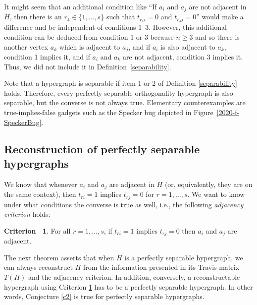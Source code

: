 \documentclass[%
12pt,
prereprint,
showpacs,
showkeys,
preprintnumbers,
amsmath,amssymb,
aps,
pra,
longbibliography,
notitlepage
]{revtex4-1}
\theoremstyle{definition}
\newtheorem{criterion}[theorem]{{\color{THM}Criterion\ }}
\begin{document}
	It might seem that an additional condition like
	``If $a_i$ and $a_j$ are not adjacent in $H$, then there is an $r_4 \in \{1,\ldots,s\}$ such that $t_{r_4 i}=0$ and $t_{r_4 j}=0$''
	would make a difference and be independent of conditions 1--3. However, this additional condition can be deduced from condition 1 or 3 because $n\geq 3$ and so there is another vertex $a_k$ which is adjacent to $a_j$, and if $a_i$ is also adjacent to $a_k$, condition 1 implies it, and if $a_i$ and $a_k$ are not adjacent, condition 3 implies it. Thus, we did not include it in Definition~\ref{separability}.
	
	Note that a hypergraph is separable if item 1 or 2 of Definition \ref{separability} holds. Therefore, every perfectly separable orthogonality hypergraph is also separable, but the converse is not always true. Elementary counterexamples are true-implies-false gadgets such as the Specker bug depicted in Figure~\ref{2020-f-SpeckerBug}.
	
	\subsection{Reconstruction of perfectly separable hypergraphs}\label{Rec-PSH}
	
	We know that whenever $a_i$ and $a_j$ are adjacent in $H$ (or, equivalently, they are on the same context), then $t_{ri}=1$  implies $t_{rj}=0$ for $r=1,\ldots,s$. We want to know under what conditions the converse is true as well, i.e., the following \emph{adjacency criterion} holds:
	\begin{criterion}
		\label{AdCr} For all $r=1,\ldots,s$, if $t_{ri}=1$ implies $t_{rj}=0$
		then $a_i$ and $a_j$ are adjacent.
	\end{criterion}
	
	The next theorem asserts that when $H$ is a perfectly separable hypergraph, we can always reconstruct $H$ from the information presented in its Travis matrix $T(H)$ and the adjacency criterion. In addition, conversely, a reconstructable hypergraph using Criterion \ref{AdCr} has to be a perfectly separable hypergraph. In other words, Conjecture \ref{c2} is true for perfectly separable hypergraphs.
	
\end{document}
